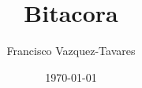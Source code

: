 \documentclass[a4paper]{tufte-handout} %
\title{Bitacora}
\author{Francisco Vazquez-Tavares}
\date{\today} %
\begin{document}
\maketitle %


\begin{abstract}
\end{abstract}


%
%
%
%
%
%
%
%

\end{document}
